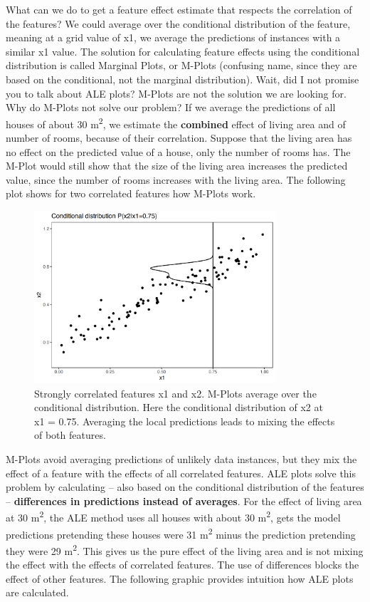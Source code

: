 \documentclass[
  11pt,
]{scrbook}
\begin{document}
What can we do to get a feature effect estimate that respects the correlation of the features?
We could average over the conditional distribution of the feature, meaning at a grid value of x1, we average the predictions of instances with a similar x1 value.
The solution for calculating feature effects using the conditional distribution is called Marginal Plots, or M-Plots (confusing name, since they are based on the conditional, not the marginal distribution).
Wait, did I not promise you to talk about ALE plots?
M-Plots are not the solution we are looking for.
Why do M-Plots not solve our problem?
If we average the predictions of all houses of about 30 m\textsuperscript{2}, we estimate the \textbf{combined} effect of living area and of number of rooms, because of their correlation.
Suppose that the living area has no effect on the predicted value of a house, only the number of rooms has.
The M-Plot would still show that the size of the living area increases the predicted value, since the number of rooms increases with the living area.
The following plot shows for two correlated features how M-Plots work.

\begin{figure}

{\centering \includegraphics[width=0.8\textwidth]{images/aleplot-motivation2-1} 

}

\caption{Strongly correlated features x1 and x2. M-Plots average over the conditional distribution. Here the conditional distribution of x2 at x1 = 0.75. Averaging the local predictions leads to mixing the effects of both features.}\label{fig:aleplot-motivation2}
\end{figure}

M-Plots avoid averaging predictions of unlikely data instances, but they mix the effect of a feature with the effects of all correlated features.
ALE plots solve this problem by calculating -- also based on the conditional distribution of the features -- \textbf{differences in predictions instead of averages}.
For the effect of living area at 30 m\textsuperscript{2}, the ALE method uses all houses with about 30 m\textsuperscript{2}, gets the model predictions pretending these houses were 31 m\textsuperscript{2} minus the prediction pretending they were 29 m\textsuperscript{2}.
This gives us the pure effect of the living area and is not mixing the effect with the effects of correlated features.
The use of differences blocks the effect of other features.
The following graphic provides intuition how ALE plots are calculated.
\end{document}
